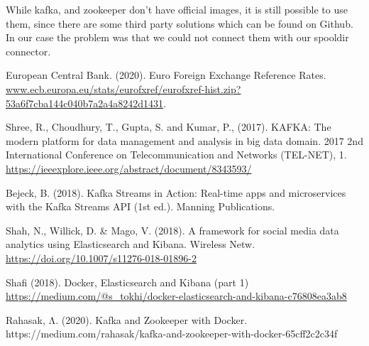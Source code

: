 \documentclass{article}
\begin{document}
While kafka, and zookeeper don't have official images, it is still possible to use them, since there are some third party solutions which can be found on Github. In our case the problem was that we could not connect them with our spooldir connector.

\newpage
\begin{thebibliography}{9}

European Central Bank. (2020). Euro Foreign Exchange Reference Rates. \url{www.ecb.europa.eu/stats/eurofxref/eurofxref-hist.zip?53a6f7cba144c040b7a2a4a8242d1431}.

Shree, R., Choudhury, T., Gupta, S. and Kumar, P., (2017). KAFKA: The modern platform for data management and analysis in big data domain. 2017 2nd International Conference on Telecommunication and Networks (TEL-NET), 1. \url{https://ieeexplore.ieee.org/abstract/document/8343593/}

Bejeck, B. (2018). Kafka Streams in Action: Real-time apps and microservices with the Kafka Streams API (1st ed.). Manning Publications.

Shah, N., Willick, D. & Mago, V. (2018). A framework for social media data analytics using Elasticsearch and Kibana. Wireless Netw. \url{https://doi.org/10.1007/s11276-018-01896-2}

Shafi (2018). Docker, Elasticsearch and Kibana (part 1) \url{https://medium.com/@s\_tokhi/docker-elasticsearch-and-kibana-c76808ea3ab8}

Rahasak, Λ. (2020). Kafka and Zookeeper with Docker. https://medium.com/rahasak/kafka-and-zookeeper-with-docker-65cff2c2c34f

\end{thebibliography}
\end{document}
